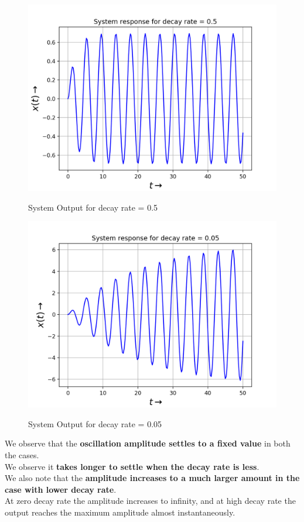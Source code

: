 \documentclass[11pt, a4paper]{article}
\begin{document}
\begin{figure}[H]
   	\centering
   	\includegraphics[scale=0.6]{ss5.png}
   	\label{fig:ss0.5}
   	\caption{System Output for decay rate = 0.5}
\end{figure}
\begin{figure}[H]
   	\centering
   	\includegraphics[scale=0.6]{ss05.png}
   	\label{fig:ss0.05}
   	\caption{System Output for decay rate = 0.05}
\end{figure}
{
We observe that the \textbf{oscillation amplitude settles to a fixed value} in both the cases.
\\We observe it \textbf{takes longer to settle when the decay rate is less}.
\\We also note that the \textbf{amplitude increases to a much larger amount in the case with lower decay rate}.
\\At zero decay rate the amplitude increases to infinity, and at high decay rate the output reaches the maximum amplitude almost instantaneously.
}
\end{document}
